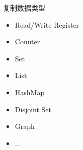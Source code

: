 \begin{frame}{}
  \begin{center}
    \begin{minipage}{0.50\textwidth}
      {\large 复制数据类型}  

      \vspace{0.20cm}
      \begin{itemize}
	\setlength{\itemsep}{4pt}
	\item Read/Write Register
	\item Counter
	\item Set
	\item List
	\item HashMap
	\item Disjoint Set
	\item Graph
	\item $\dots$
      \end{itemize}
    \end{minipage}
  \end{center}
\end{frame}

\begin{frame}{}
  \begin{columns}
      \centerline{\hl{}}
  \end{columns}

  \pause
  \vspace{0.30cm}
  \centerline{}
\end{frame}

\begin{frame}{}
\end{frame}

